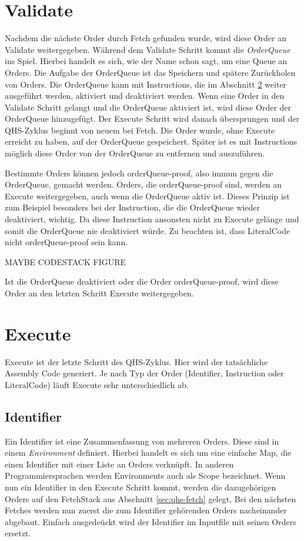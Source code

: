 \section{Validate} \label{sec:qhs-Validate}
Nachdem die nächste Order durch Fetch gefunden wurde, wird diese Order an Validate weitergegeben. Während dem Validate Schritt kommt die \textit{OrderQueue} ins Spiel. Hierbei handelt es sich, wie der Name schon sagt, um eine Queue an Orders.
Die Aufgabe der OrderQueue ist das Speichern und spätere Zurückholen von Orders. Die OrderQueue kann mit Instructions, die im Abschnitt \ref{sec:qhs-execute} weiter ausgeführt werden, aktiviert und deaktiviert werden.
Wenn eine Order in den Validate Schritt gelangt und die OrderQueue aktiviert ist, wird diese Order der OrderQueue hinzugefügt. Der Execute Schritt wird danach übersprungen und der QHS-Zyklus beginnt von neuem bei Fetch.
Die Order wurde, ohne Execute erreicht zu haben, auf der OrderQueue gespeichert. Später ist es mit Instructions möglich diese Order von der OrderQueue zu entfernen und auszuführen.

Bestimmte Orders können jedoch orderQueue-proof, also immun gegen die OrderQueue, gemacht werden. Orders, die orderQueue-proof sind, werden an Execute weitergegeben, auch wenn die OrderQueue aktiv ist.
Dieses Prinzip ist zum Beispiel besonders bei der Instruction, die die OrderQueue wieder deaktiviert, wichtig. Da diese Instruction ansonsten nicht zu Execute gelänge und somit die OrderQueue nie deaktiviert würde.
Zu beachten ist, dass LiteralCode nicht orderQueue-proof sein kann.

MAYBE CODESTACK FIGURE

Ist die OrderQueue deaktiviert oder die Order orderQueue-proof, wird diese Order an den letzten Schritt Execute weitergegeben.

\section{Execute} \label{sec:qhs-execute}
Execute ist der letzte Schritt des QHS-Zyklus. Hier wird der tatsächliche Assembly Code generiert. Je nach Typ der Order (Identifier, Instruction oder LiteralCode) läuft Execute sehr unterschiedlich ab.

\subsection{Identifier}
Ein Identifier ist eine Zusammenfassung von mehreren Orders. Diese sind in einem \textit{Environment} definiert.
Hierbei handelt es sich um eine einfache Map, die einen Identifier mit einer Liste an Orders verknüpft.
In anderen Programmiersprachen werden Environments auch als Scope bezeichnet.
Wenn nun ein Identifier in den Execute Schritt kommt, werden die dazugehörigen Orders auf den FetchStack aus Abschnitt \ref{sec:qhs-fetch} gelegt.
Bei den nächsten Fetches werden nun zuerst die zum Identifier gehörenden Orders nacheinander abgebaut. Einfach ausgedeückt wird der Identifier im Inputfile mit seinen Orders ersetzt.

